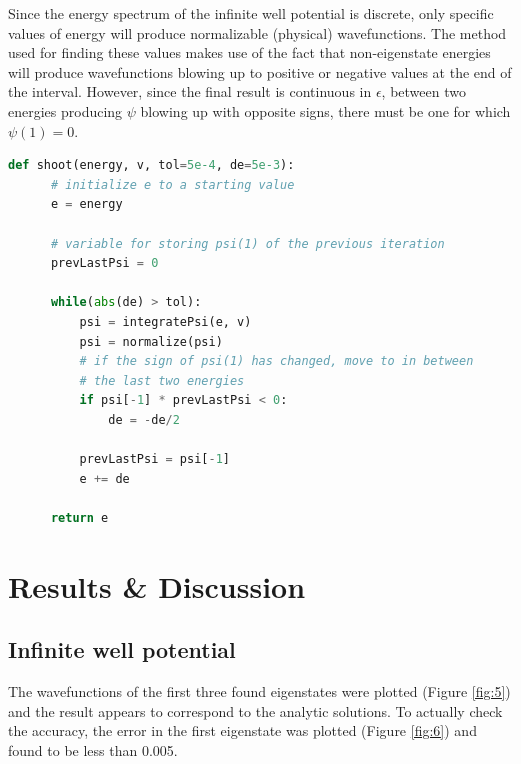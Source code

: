 \documentclass[11pt]{article}
\begin{document}
Since the energy spectrum of the infinite well potential is discrete, only specific
values of energy will produce normalizable (physical) wavefunctions. 
The method used for finding these values makes use of the fact that non-eigenstate
energies will produce wavefunctions blowing up to positive or negative
values at the end of the interval.
However, since the final result is continuous in $\epsilon$, 
between two energies producing $\psi$ blowing
up with opposite signs, there must be one for which $\psi(1)=0$.

\begin{lstlisting}[language=Python, style=myStyle]
  def shoot(energy, v, tol=5e-4, de=5e-3):
      # initialize e to a starting value
      e = energy

      # variable for storing psi(1) of the previous iteration
      prevLastPsi = 0

      while(abs(de) > tol):
          psi = integratePsi(e, v)
          psi = normalize(psi)
          # if the sign of psi(1) has changed, move to in between 
          # the last two energies
          if psi[-1] * prevLastPsi < 0:
              de = -de/2

          prevLastPsi = psi[-1]
          e += de

      return e
\end{lstlisting}

\section{Results \& Discussion}
\vspace{-.4cm}
\subsection{Infinite well potential}

The wavefunctions of the first three found eigenstates were plotted
(Figure \ref{fig:5}) and
the result appears to correspond to the analytic solutions. To actually
check the accuracy, the error in the first eigenstate was plotted 
(Figure \ref{fig:6}) and found to
be less than 0.005.
\end{document}
